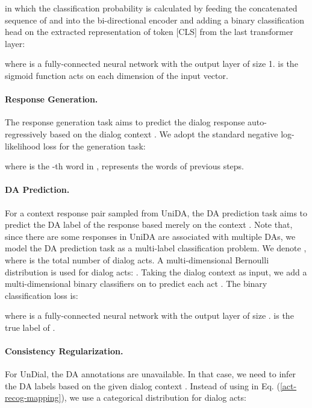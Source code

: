 \documentclass[letterpaper]{article} \usepackage{aaai22}  \usepackage{times}  \usepackage{helvet}  \usepackage{courier}  \usepackage[hyphens]{url}  \usepackage{graphicx} \urlstyle{rm} \def\UrlFont{\rm}  \usepackage{natbib}  \usepackage{caption} \DeclareCaptionStyle{ruled}{labelfont=normalfont,labelsep=colon,strut=off} \frenchspacing  \setlength{\pdfpagewidth}{8.5in}  \setlength{\pdfpageheight}{11in}  \usepackage{algorithm}
\begin{document}
in which the classification probability  is calculated by feeding the concatenated sequence of  and  into the bi-directional encoder and adding a binary classification head on the extracted representation  of token [CLS] from the last transformer layer:

where  is a fully-connected neural network with the output layer of size 1.  is the sigmoid function acts on each dimension of the input vector.






\paragraph{Response Generation.}
The response generation task aims to predict the dialog response  auto-regressively based on the dialog context .
We adopt the standard negative log-likelihood loss for the generation task:

where  is the -th word in ,  represents the  words of previous steps.





\paragraph{DA Prediction.}


For a context response pair  sampled from UniDA, the DA prediction task aims to predict the DA label  of the response  based merely on the context . 
Note that, since there are some responses in UniDA are associated with multiple DAs, we model the DA prediction task as a multi-label classification problem. 
We denote , where  is the total number of dialog acts. A multi-dimensional Bernoulli  distribution is used for dialog acts: .  
Taking the dialog context  as input, we add a multi-dimensional binary classifiers on  to predict each act . The binary classification loss is:




where  is a fully-connected neural network with the output layer of size . 
 is the true label of .


\paragraph{Consistency Regularization.}
For UnDial, the DA annotations are unavailable. In that case, we need to infer the DA labels based on the  given dialog context . Instead of using  in Eq. (\ref{act-recog-mapping}), we use a categorical distribution  for dialog acts:
\end{document}
